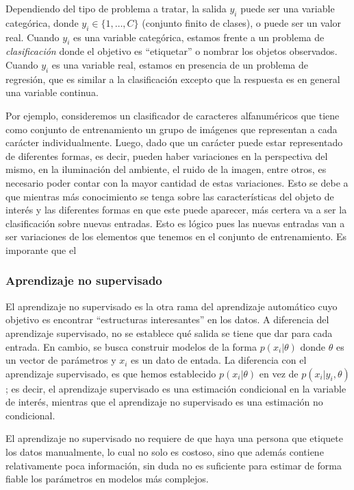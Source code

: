 	Dependiendo del tipo de problema a tratar, la salida $y_i$ puede ser una variable categórica, donde $y_i \in \{1,\dots,C\}$ (conjunto finito de clases), o puede ser un valor real. Cuando $y_i$ es una variable categórica, estamos frente a un problema de \textit{clasificación} donde el objetivo es ``etiquetar'' o nombrar los objetos observados. Cuando $y_i$ es una variable real, estamos en presencia de un problema de regresión, que es similar a la clasificación excepto que la respuesta es en general una variable continua.
	
	Por ejemplo, consideremos un clasificador de caracteres alfanuméricos que tiene como conjunto de entrenamiento un grupo de imágenes que representan a cada carácter individualmente. Luego, dado que un carácter puede estar representado de diferentes formas, es decir, pueden haber variaciones en la perspectiva del mismo, en la iluminación del ambiente, el ruido de la imagen, entre otros, es necesario poder contar con la mayor cantidad de estas variaciones. Esto se debe a que mientras más conocimiento se tenga sobre las características del objeto de interés y las diferentes formas en que este puede aparecer, más certera va a ser la clasificación sobre nuevas entradas. Esto es lógico pues las nuevas entradas van a ser variaciones de los elementos que tenemos en el conjunto de entrenamiento. Es imporante que el
	

	\subsubsection{Aprendizaje no supervisado}
	
		El aprendizaje no supervisado es la otra rama del aprendizaje automático cuyo objetivo es encontrar ``estructuras interesantes'' en los datos. A diferencia del aprendizaje supervisado, no se establece qué salida se tiene que dar para cada entrada. En cambio, se busca construir modelos de la forma $p(x_i | \theta)$ donde $\theta$ es un vector de parámetros y $x_i$ es un dato de entada. La diferencia con el aprendizaje supervisado, es que hemos establecido $p(x_i | \theta)$ en vez de $p(x_i | y_i, \theta)$; es decir, el aprendizaje supervisado es una estimación condicional en la variable de interés, mientras que el aprendizaje no supervisado es una estimación no condicional.
		
		El aprendizaje no supervisado no requiere de que haya una persona que etiquete los datos manualmente, lo cual no solo es costoso, sino que además contiene relativamente poca información, sin duda no es suficiente para estimar de forma fiable los parámetros en modelos más complejos.